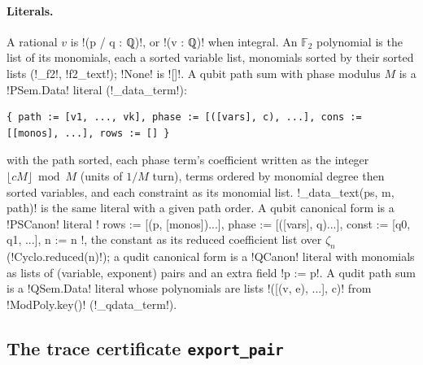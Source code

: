 {{{\paragraph{Literals.} A rational $v$ is \lexlean!(p / q : ℚ)!, or \lexlean!(v : ℚ)! when integral. An
$\mathbb{F}_2$ polynomial is the list of its monomials, each a sorted variable list, monomials sorted
by their sorted lists (\lexpy!_f2!, \lexpy!f2_text!); \lexpy!None! is \lexlean![]!. A qubit path sum with
phase modulus $M$ is a \lexlean!PSem.Data! literal (\lexpy!_data_term!):
\begin{lstlisting}[style=lexlean]
{ path := [v1, ..., vk], phase := [([vars], c), ...], cons := [[monos], ...], rows := [] }
\end{lstlisting}
with the path sorted, each phase term's coefficient written as the integer
$\lfloor cM\rfloor \bmod M$ (units of $1/M$ turn), terms ordered by monomial degree then sorted
variables, and each constraint as its monomial list. \lexpy!_data_text(ps, m, path)! is the same
literal with a given path order. A qubit canonical form is a \lexlean!PSCanon! literal
\lexcode!{ rows := [(p, [monos])...], phase := [([vars], q)...], const := [q0, q1, ...], n := n }!,
the constant as its reduced coefficient list over $\zeta_n$ (\lexpy!Cyclo.reduced(n)!); a qudit
canonical form is a \lexlean!QCanon! literal with monomials as lists of
(variable, exponent) pairs and an extra field \lexcode!p := p!. A qudit path sum is a
\lexlean!QSem.Data! literal whose polynomials are lists \lexcode!([(v, e), ...], c)! from
\lexpy!ModPoly.key()! (\lexpy!_qdata_term!).

\subsection{The trace certificate \texttt{export\_pair}}

}}}
